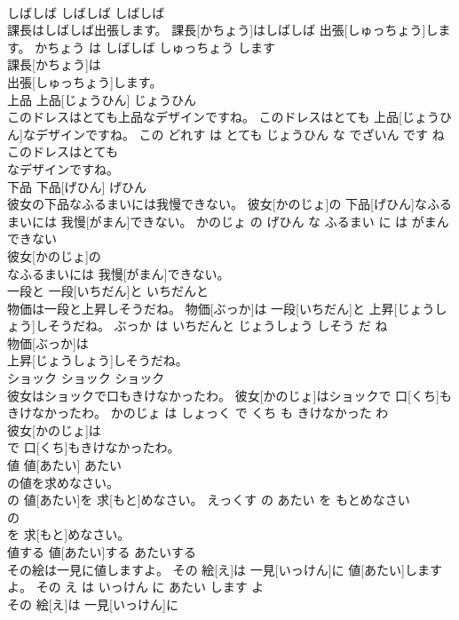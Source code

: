 \documentclass[8pt]{extreport}
\begin{document}
\begin{CJK}{UTF8}{min}
\\	しばしば	しばしば	しばしば	
\\	課長はしばしば出張します。	課長[かちょう]はしばしば 出張[しゅっちょう]します。	かちょう は しばしば しゅっちょう します	
\\	課長[かちょう]は
\\	出張[しゅっちょう]します。			
\\	上品	上品[じょうひん]	じょうひん	
\\	このドレスはとても上品なデザインですね。	このドレスはとても 上品[じょうひん]なデザインですね。	この どれす は とても じょうひん な でざいん です ね	
\\	このドレスはとても
\\	なデザインですね。			
\\	下品	下品[げひん]	げひん	
\\	彼女の下品なふるまいには我慢できない。	彼女[かのじょ]の 下品[げひん]なふるまいには 我慢[がまん]できない。	かのじょ の げひん な ふるまい に は がまん できない	
\\	彼女[かのじょ]の
\\	なふるまいには 我慢[がまん]できない。			
\\	一段と	一段[いちだん]と	いちだんと	
\\	物価は一段と上昇しそうだね。	物価[ぶっか]は 一段[いちだん]と 上昇[じょうしょう]しそうだね。	ぶっか は いちだんと じょうしょう しそう だ ね	
\\	物価[ぶっか]は
\\	上昇[じょうしょう]しそうだね。			
\\	ショック	ショック	ショック	
\\	彼女はショックで口もきけなかったわ。	彼女[かのじょ]はショックで 口[くち]もきけなかったわ。	かのじょ は しょっく で くち も きけなかった わ	
\\	彼女[かのじょ]は
\\	で 口[くち]もきけなかったわ。			
\\	値	値[あたい]	あたい	
\\	の値を求めなさい。	
\\	[えっくす]の 値[あたい]を 求[もと]めなさい。	えっくす の あたい を もとめなさい	
\\	[えっくす]の
\\	を 求[もと]めなさい。			
\\	値する	値[あたい]する	あたいする	
\\	その絵は一見に値しますよ。	その 絵[え]は 一見[いっけん]に 値[あたい]しますよ。	その え は いっけん に あたい します よ	
\\	その 絵[え]は 一見[いっけん]に

\end{CJK}
\end{document}
